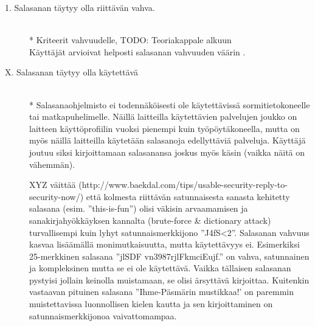 \documentclass[english,gradu]{tktltiki}
\begin{document}
         \begin{description}

           \item[1. Salasanan täytyy olla riittävän vahva.] \hfill \\
            * Kriteerit vahvuudelle, TODO: Teoriakappale alkuun \\
             Käyttäjät arvioivat helposti salasanan vahvuuden väärin \cite{password_management_strategies_06}.

           \item[X. Salasanan täytyy olla käytettävä] \hfill \\
            * Salasanaohjelmisto ei todennäköisesti ole käytettävissä sormitietokoneelle tai matkapuhelimelle. Näillä laitteilla käytettävien palvelujen joukko on laitteen käyttöprofiilin vuoksi pienempi kuin työpöytäkoneella, mutta on myös näillä laitteilla käytetään salasanoja edellyttäviä palveluja. Käyttäjä joutuu siksi kirjoittamaan salasanansa joskus myös käsin (vaikka näitä on vähemmän).

            XYZ väittää (http://www.baekdal.com/tips/usable-security-reply-to-security-now/) että kolmesta riittävän satunnaisesta sanasta kehitetty salasana (esim. ''this-is-fun'') olisi väkisin arvaamamisen ja sanakirjahyökkäyksen kannalta (brute-force \& dictionary attack) turvallisempi kuin lyhyt satunnaismerkkijono  ''J4fS<2''. Salasanan vahvuus kasvaa lisäämällä monimutkaisuutta, mutta käytettävyys ei. Esimerkiksi 25-merkkinen salasana ''jlSDF vn3987rjlFkmciEujf.'' on vahva, satunnainen ja kompleksinen mutta se ei ole käytettävä. Vaikka tällaisen salasanan pystyisi jollain keinolla muistamaan, se olisi ärsyttävä kirjoittaa. Kuitenkin vastaavan pituinen salasana ''Ihme-Päsmärin mustikkaa!' on paremmin muistettavissa luonnollisen kielen kautta ja sen kirjoittaminen on satunnaismerkkijonoa vaivattomampaa.



\end{description}
\end{document}
